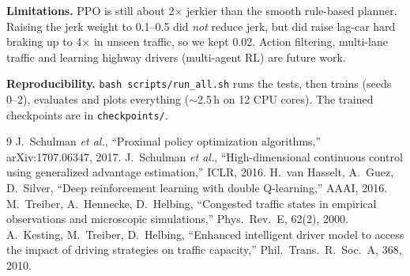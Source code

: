 \documentclass[conference,10pt]{IEEEtran}
\begin{document}
\textbf{Limitations.} PPO is still about 2$\times$ jerkier than the smooth
rule-based planner. Raising the jerk weight to 0.1--0.5 did \emph{not} reduce
jerk, but did raise lag-car hard braking up to 4$\times$ in unseen traffic, so
we kept 0.02. Action filtering, multi-lane traffic and learning highway
drivers (multi-agent RL) are future work.

\textbf{Reproducibility.} \texttt{bash scripts/run\_all.sh} runs the tests,
then trains (seeds 0--2), evaluates and plots everything ($\sim$2.5\,h on 12
CPU cores). The trained checkpoints are in \texttt{checkpoints/}.


\begin{thebibliography}{9}\footnotesize
{} J.~Schulman \emph{et al.}, ``Proximal policy optimization algorithms,'' arXiv:1707.06347, 2017.
 J.~Schulman \emph{et al.}, ``High-dimensional continuous control using generalized advantage estimation,'' ICLR, 2016.
 H.~van Hasselt, A.~Guez, D.~Silver, ``Deep reinforcement learning with double Q-learning,'' AAAI, 2016.
 M.~Treiber, A.~Hennecke, D.~Helbing, ``Congested traffic states in empirical observations and microscopic simulations,'' Phys.\ Rev.\ E, 62(2), 2000.
 A.~Kesting, M.~Treiber, D.~Helbing, ``Enhanced intelligent driver model to access the impact of driving strategies on traffic capacity,'' Phil.\ Trans.\ R.\ Soc.\ A, 368, 2010.
\end{thebibliography}
\end{document}

